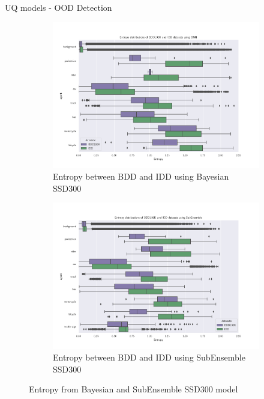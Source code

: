 \documentclass[10pt, aspectratio=169]{beamer}
\begin{document}
\begin{frame}[allowframebreaks]{UQ models - OOD Detection}
    \begin{figure}[H]
        \captionsetup[table]{skip=0pt}
            \centering
            \begin{subfigure}[t]{0.495\textwidth}
                \centering
                \includegraphics[width=\textwidth]{images/distributions/BNN_bdd_vs_iid_entropy.png}
                \caption{Entropy between BDD and IDD using Bayesian SSD300}
            \end{subfigure}
            \begin{subfigure}[t]{0.495\textwidth}
                \centering
                \includegraphics[width=\textwidth]{images/distributions/SubEns_bdd_vs_iid_entropy.png}
                \caption{Entropy between BDD and IDD using SubEnsemble SSD300}
            \end{subfigure}
            \caption{Entropy from Bayesian and SubEnsemble SSD300 model}
    \end{figure}


\end{frame}
\end{document}
